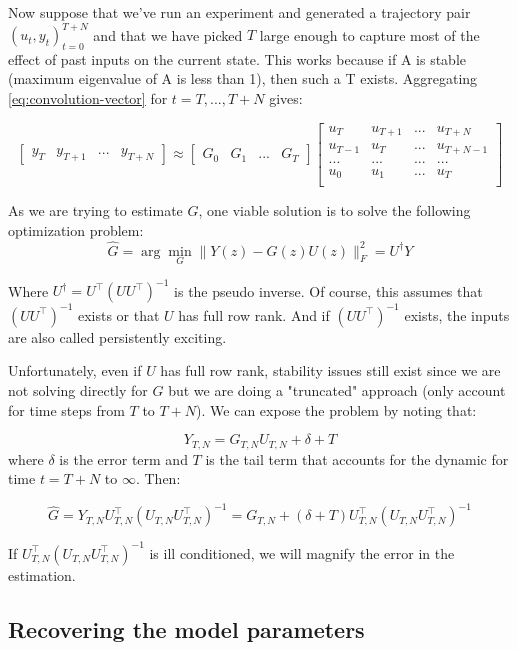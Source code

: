 \documentclass{article}[12pt]
\begin{document}
Now suppose that we've run an experiment and generated a trajectory pair $(u_t, y_t)_{t=0}^{T+N}$ and that we have picked $T$ large enough to capture most of the effect of past inputs on the current state. This works because if A is stable (maximum eigenvalue of A is less than 1), then such a T exists. Aggregating \eqref{eq:convolution-vector} for $t = T, ..., T+N$  gives:

\begin{equation*}
    \begin{bmatrix}y_T &y_{T+1} &... &y_{T+N} \end{bmatrix} \approx \begin{bmatrix}G_0 &G_1 &... &G_{T}\end{bmatrix}
    \begin{bmatrix}u_T &u_{T+1} &... &u_{T+N}\\
    u_{T-1} &u_T &... &u_{T+N-1}\\
    ... &... &... &...\\
    u_0 &u_1 &... &u_T\\
    \end{bmatrix}
\end{equation*}

As we are trying to estimate $G$, one viable solution is to solve the following optimization problem:
$$ \hat{G} = \arg\min_G\rVert Y(z) - G(z)U(z)\rVert^2_F = U^{\dagger}Y $$

Where $U^{\dagger} = U^\top(UU^\top)^{-1}$ is the pseudo inverse. Of course, this assumes that $(UU^\top)^{-1}$ exists or that $U$ has full row rank. And if  $(UU^\top)^{-1}$ exists, the inputs are also called persistently exciting. 

Unfortunately, even if $U$ has full row rank, stability issues still exist since we are not solving directly for $G$ but we are doing a "truncated" approach (only account for time steps from $T$ to $T+N$). We can expose the problem by noting that:

$$ Y_{T, N} = G_{T, N}U_{T, N} + \delta + T $$
where $\delta$ is the error term and $T$ is the tail term that accounts for the dynamic for time $t = T + N$ to $\infty$. Then:

$$\hat{G} = Y_{T, N}U_{T, N}^\top (U_{T,N}U_{T,N}^\top)^{-1} = G_{T,N}+(\delta + T)U_{T,N}^\top (U_{T,N}U_{T,N}^\top)^{-1} $$

If $U_{T,N}^\top (U_{T,N}U_{T,N}^\top)^{-1}$ is ill conditioned, we will magnify the error in the estimation.

\subsection{Recovering the model parameters}
\end{document}
